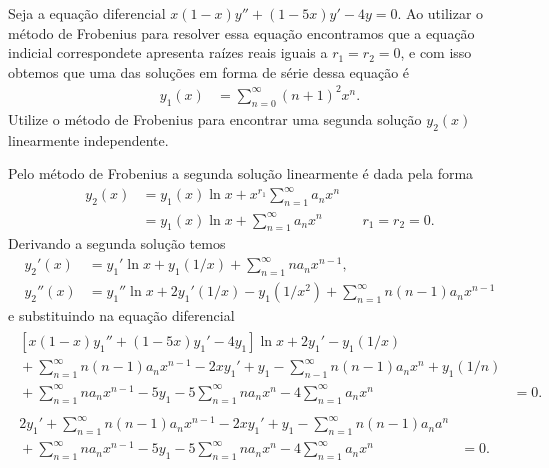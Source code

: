 \documentclass[a4paper,12pt, leqno, answers]{exam}
\begin{document}
\begin{questions}
    \question[T2 de 2012, P1 de 2012] Seja a equa\c{c}\~{a}o diferencial $x(1 - x) y'' + (1 - 5x) y' - 4y = 0$. Ao utilizar o m\'{e}todo de Frobenius para resolver essa equa\c{c}\~{a}o encontramos que a equa\c{c}\~{a}o indicial correspondete apresenta ra\'{i}zes reais iguais a $r_1 = r_2 = 0$, e com isso obtemos que uma das solu\c{c}\~{o}es em forma de s\'{e}rie dessa equa\c{c}\~{a}o \'{e}
    \begin{align*}
        y_1(x) &= \sum_{n = 0}^\infty (n + 1)^2 x^n.
    \end{align*}
    Utilize o m\'{e}todo de Frobenius para encontrar uma segunda solu\c{c}\~{a}o $y_2(x)$ linearmente independente.
    \begin{solution}
        Pelo m\'{e}todo de Frobenius a segunda solu\c{c}\~{a}o linearmente \'{e} dada pela forma
        \begin{align*}
            y_2(x) &= y_1(x) \ln x + x^{r_1} \sum_{n = 1}^\infty a_n x^n \\
            &= y_1(x) \ln x + \sum_{n = 1}^\infty a_n x^n && r_1 = r_2 = 0.
        \end{align*}
        Derivando a segunda solu\c{c}\~{a}o temos
        \begin{align*}
            y_2'(x) &= y_1' \ln x + y_1 (1/x) + \sum_{n = 1}^\infty n a_n x^{n - 1}, \\
            y_2''(x) &= y_1'' \ln x + 2 y_1' (1/x) - y_1 (1/x^2) + \sum_{n = 1}^\infty n (n - 1) a_n x^{n - 1}
        \end{align*}
        e substituindo na equa\c{c}\~{a}o diferencial
        \begin{align*}
            \begin{split}
                \left[ x (1 - x) y_1'' + (1 - 5x) y_1' - 4y_1 \right] \ln x + 2 y_1' - y_1 (1/x) & \\
                {}+ \sum_{n = 1}^\infty n (n - 1) a_n x^{n - 1} - 2 x y_1' + y_1 - \sum_{n - 1}^\infty n (n - 1) a_n x^n + y_1 (1/n) & \\
                {}+ \sum_{n = 1}^\infty n a_n x^{n - 1} - 5y_1 - 5 \sum_{n = 1}^\infty n a_n x^n - 4 \sum_{n = 1}^\infty a_n x^n &= 0.
            \end{split} \\
            \begin{split}
                2 y_1' + \sum_{n = 1}^\infty n (n - 1) a_n x^{n - 1} - 2 x y_1' + y_1 - \sum_{n = 1}^\infty n (n - 1) a_n a^n & \\
                {}+ \sum_{n = 1}^\infty n a_n x^{n - 1} - 5 y_1 - 5 \sum_{n = 1}^\infty n a_n x^n - 4 \sum_{n = 1}^\infty a_n x^n &= 0.

\end{split}
\end{align*}
\end{solution}
\end{questions}
\end{document}
